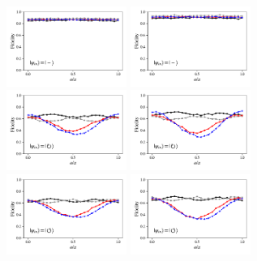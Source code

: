 \documentclass[a4paper]{article}
\begin{document}
\begin{figure}[H]
	\\
	\includegraphics[width=0.35\textwidth]{fidelity_qc10_mit1_state3}
	\includegraphics[width=0.35\textwidth]{fidelity_qc10_mit0_state3}
	\\
	\includegraphics[width=0.35\textwidth]{fidelity_qc10_mit1_state4}
	\includegraphics[width=0.35\textwidth]{fidelity_qc10_mit0_state4}
	\\
	\includegraphics[width=0.35\textwidth]{fidelity_qc10_mit1_state5}
	\includegraphics[width=0.35\textwidth]{fidelity_qc10_mit0_state5}
\end{figure}
\end{document}
